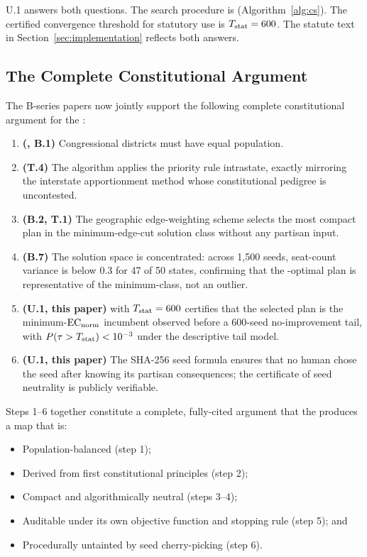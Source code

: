 U.1 answers both questions.
The search procedure is \cs{} (Algorithm~\ref{alg:cs}).
The certified convergence threshold for statutory use is $T_{\mathrm{stat}} = 600$.
The \dia{} statute text in Section~\ref{sec:implementation} reflects both
answers.

\subsection{The Complete Constitutional Argument}

The B-series papers now jointly support the following complete constitutional
argument for the \dia{}:

\begin{enumerate}
\item \textbf{(\wesberry{}, B.1)} Congressional districts must have equal
      population.
\item \textbf{(T.4)} The \ar{} algorithm applies the \hh{} priority rule
      intrastate, exactly mirroring the interstate apportionment method whose
      constitutional pedigree is uncontested.
\item \textbf{(B.2, T.1)} The geographic edge-weighting scheme selects the
      most compact plan in the minimum-edge-cut solution class without any
      partisan input.
\item \textbf{(B.7)} The solution space is concentrated: across 1{,}500 seeds,
      seat-count variance is below 0.3 for 47 of 50 states, confirming that
      the \cs{}-optimal plan is representative of the minimum-class, not an
      outlier.
\item \textbf{(U.1, this paper)} \cs{} with $T_{\mathrm{stat}} = 600$ certifies that
      the selected plan is the minimum-$\mathrm{EC}_{\mathrm{norm}}$ incumbent observed before a
      600-seed no-improvement tail, with $P(\tau > T_{\mathrm{stat}}) < 10^{-3}$ under
      the descriptive tail model.
\item \textbf{(U.1, this paper)} The SHA-256 seed formula ensures that no
      human chose the seed after knowing its partisan consequences; the
      certificate of seed neutrality is publicly verifiable.
\end{enumerate}

Steps 1--6 together constitute a complete, fully-cited argument that the
\dia{} produces a map that is:
\begin{itemize}
\item Population-balanced (step 1);
\item Derived from first constitutional principles (step 2);
\item Compact and algorithmically neutral (steps 3--4);
\item Auditable under its own objective function and stopping rule (step 5); and
\item Procedurally untainted by seed cherry-picking (step 6).
\end{itemize}

